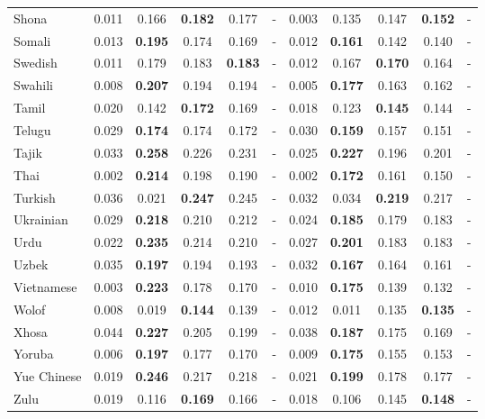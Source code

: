 \begin{longtable}{lcccccccccc}
Shona & 0.011 & 0.166 & \textbf{0.182} & 0.177 & - & 0.003 & 0.135 & 0.147 & \textbf{0.152} & - \\
Somali & 0.013 & \textbf{0.195} & 0.174 & 0.169 & - & 0.012 & \textbf{0.161} & 0.142 & 0.140 & - \\
Swedish & 0.011 & 0.179 & 0.183 & \textbf{0.183} & - & 0.012 & 0.167 & \textbf{0.170} & 0.164 & - \\
Swahili & 0.008 & \textbf{0.207} & 0.194 & 0.194 & - & 0.005 & \textbf{0.177} & 0.163 & 0.162 & - \\
Tamil & 0.020 & 0.142 & \textbf{0.172} & 0.169 & - & 0.018 & 0.123 & \textbf{0.145} & 0.144 & - \\
Telugu & 0.029 & \textbf{0.174} & 0.174 & 0.172 & - & 0.030 & \textbf{0.159} & 0.157 & 0.151 & - \\
Tajik & 0.033 & \textbf{0.258} & 0.226 & 0.231 & - & 0.025 & \textbf{0.227} & 0.196 & 0.201 & - \\
Thai & 0.002 & \textbf{0.214} & 0.198 & 0.190 & - & 0.002 & \textbf{0.172} & 0.161 & 0.150 & - \\
Turkish & 0.036 & 0.021 & \textbf{0.247} & 0.245 & - & 0.032 & 0.034 & \textbf{0.219} & 0.217 & - \\
Ukrainian & 0.029 & \textbf{0.218} & 0.210 & 0.212 & - & 0.024 & \textbf{0.185} & 0.179 & 0.183 & - \\
Urdu & 0.022 & \textbf{0.235} & 0.214 & 0.210 & - & 0.027 & \textbf{0.201} & 0.183 & 0.183 & - \\
Uzbek & 0.035 & \textbf{0.197} & 0.194 & 0.193 & - & 0.032 & \textbf{0.167} & 0.164 & 0.161 & - \\
Vietnamese & 0.003 & \textbf{0.223} & 0.178 & 0.170 & - & 0.010 & \textbf{0.175} & 0.139 & 0.132 & - \\
Wolof & 0.008 & 0.019 & \textbf{0.144} & 0.139 & - & 0.012 & 0.011 & 0.135 & \textbf{0.135} & - \\
Xhosa & 0.044 & \textbf{0.227} & 0.205 & 0.199 & - & 0.038 & \textbf{0.187} & 0.175 & 0.169 & - \\
Yoruba & 0.006 & \textbf{0.197} & 0.177 & 0.170 & - & 0.009 & \textbf{0.175} & 0.155 & 0.153 & - \\
Yue Chinese & 0.019 & \textbf{0.246} & 0.217 & 0.218 & - & 0.021 & \textbf{0.199} & 0.178 & 0.177 & - \\
Zulu & 0.019 & 0.116 & \textbf{0.169} & 0.166 & - & 0.018 & 0.106 & 0.145 & \textbf{0.148} & - \\
\end{longtable}
\endgroup